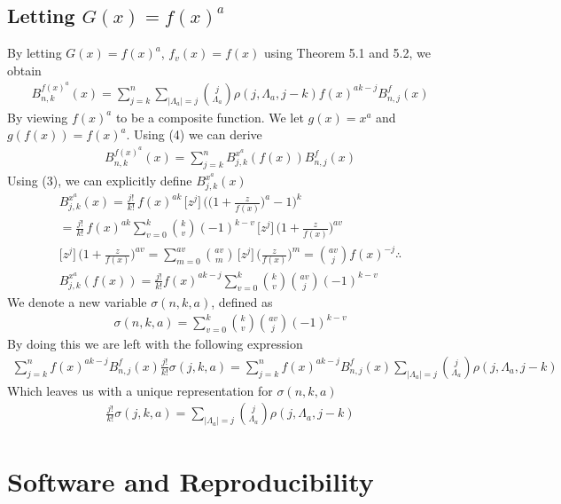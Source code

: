\documentclass[11pt]{article}
\theoremstyle{plain}
\theoremstyle{definition}
\begin{document}
\subsection{Letting $G(x) = f(x)^a$}
By letting $G(x) = f(x)^a$, $f_v(x) = f(x)$ using Theorem 5.1 and 5.2, we obtain
\begin{align*}
B_{n,k}^{f(x)^a}(x) = \sum_{j=k}^{n} \sum_{|\Lambda_a|=j} \binom{j}{\Lambda_a} \rho(j,\Lambda_a,j-k) f(x)^{ak-j} B_{n,j}^f(x)
\end{align*}
By viewing $f(x)^a$ to be a composite function. We let $g(x) = x^a$ and $g(f(x)) = f(x)^a$. Using (4) we can derive 
\begin{align*}
 B_{n,k}^{f(x)^a}(x) = \sum_{j=k}^n B_{j,k}^{x^a}(f(x)) B_{n,j}^f(x)
\end{align*}
Using (3), we can explicitly define $B_{j,k}^{x^a}(x)$
\begin{align*}
B_{j,k}^{x^a}(x) = \frac{j!}{k!} \, f(x)^{a k} \, \big[ z^j \big] \, \Bigg( \Big( 1 + \frac{z}{f(x)} \Big)^a - 1 \Bigg)^k \\
= \frac{j!}{k!} \, f(x)^{a k} \sum_{v=0}^k \binom{k}{v}(-1)^{k-v}  \, \big[ z^j \big] \, \Big( 1 + \frac{z}{f(x)} \Big)^{av} \\
\big[ z^j \big] \, \Big( 1 + \frac{z}{f(x)} \Big)^{av} = \sum_{m=0}^{av} \binom{av}{m} \, \big[ z^j \big] \, \Big(\frac{z}{f(x)}\Big)^m = \binom{av}{j}f(x)^{-j} \therefore \\
B_{j,k}^{x^a}(f(x)) = \frac{j!}{k!}f(x)^{ak-j}\sum_{v=0}^k \binom{k}{v} \binom{av}{j}(-1)^{k-v}
\end{align*}
We denote a new variable $\sigma(n,k,a)$, defined as
\begin{align*}
\sigma(n,k,a) = \sum_{v=0}^k \binom{k}{v} \binom{av}{j}(-1)^{k-v}
\end{align*}
By doing this we are left with the following expression
\begin{align*}
\sum_{j=k}^n f(x)^{ak-j}B_{n,j}^f(x) \frac{j!}{k!} \sigma(j,k,a) = \sum_{j=k}^n f(x)^{ak-j}B_{n,j}^f(x) \sum_{|\Lambda_a|=j} \binom{j}{\Lambda_a} \rho(j,\Lambda_a,j-k)
\end{align*}
Which leaves us with a unique representation for $\sigma(n,k,a)$
\begin{align*}
\frac{j!}{k!} \sigma(j,k,a)= \sum_{|\Lambda_a|=j} \binom{j}{\Lambda_a} \rho(j,\Lambda_a,j-k)
\end{align*}

\section{Software and Reproducibility}
\end{document}
